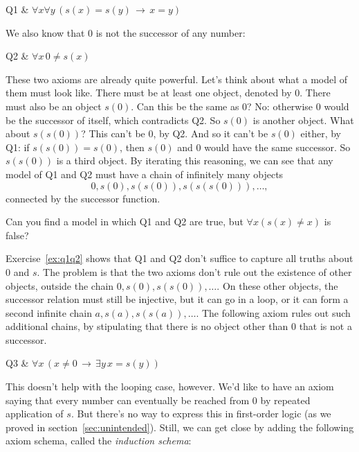 \begin{axioms}
  Q1 & $\forall x\forall y\, (s(x)\!=\!s(y) \,\to\, x\!=\!y)$
\end{axioms}

We also know that 0 is not the successor of any number:

\begin{axioms}
  Q2 & $\forall x \, 0\! \not= \!s(x)$
\end{axioms}

These two axioms are already quite powerful.
Let's think about what a model of them must look like.
There must be at least one object,
denoted by 0.
There must also be an object $s(0)$.
Can this be the same as 0?
No:
otherwise 0 would be the successor of itself,
which contradicts Q2.
So $s(0)$ is another object.
What about $s(s(0))$?
This can't be 0, by Q2.
And so it can't be $s(0)$ either, by Q1:
if $s(s(0)) = s(0)$,
then $s(0)$ and $0$ would have the same successor.
So $s(s(0))$ is a third object.
By iterating this reasoning,
we can see that any model of Q1 and Q2 must have
a chain of infinitely many objects
\[
  0, s(0), s(s(0)), s(s(s(0))), \ldots,
\]
connected by the successor function.

\begin{exercise}\label{ex:q1q2}
  Can you find a model in which Q1 and Q2 are true,
  but $\forall x (s(x) \ne x)$ is false?
\end{exercise}

Exercise~\ref{ex:q1q2} shows that
Q1 and Q2 don't suffice to capture all truths about 0 and $s$.
The problem is that
the two axioms don't rule out the existence of other objects,
outside the chain $0, s(0), s(s(0)), \ldots$.
On these other objects,
the successor relation must still be injective,
but it can go in a loop,
or it can form a second infinite chain
$a, s(a), s(s(a)), \ldots$.
The following axiom rules out such additional chains,
by stipulating that there is no object other than 0 that is not a successor.

\begin{axioms}
  Q3 & $\forall x \,(x\!\not= 0 \,\to\, \exists y\, x\!=\!s(y))$
\end{axioms}

This doesn't help with the looping case,
however.
We'd like to have an axiom saying that
every number can eventually be reached from 0 by repeated application of $s$.
But there's no way to express this in first-order logic
(as we proved in section~\ref{sec:unintended}).
Still,
we can get close
by adding the following axiom schema,
called the \emph{induction schema}:

